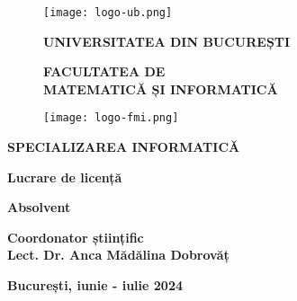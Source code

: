 \begin{titlepage}


\begin{figure}[!htb]
    \centering
    \begin{minipage}{0.2\textwidth}
        \texttt{[image: logo-ub.png]}
    \end{minipage}
    \begin{minipage}{0.5\textwidth}
        \large
        \vspace{0.2cm}
        \begin{center}
            \textbf{UNIVERSITATEA DIN BUCUREȘTI}
        \end{center}
        \vspace{0.3cm}
        \begin{center}
            \textbf{
                FACULTATEA DE \\
                MATEMATICĂ ȘI INFORMATICĂ
            }
        \end{center}
    \end{minipage}
    \begin{minipage}{0.2\textwidth}
        \texttt{[image: logo-fmi.png]}
    \end{minipage}
\end{figure}

\begin{center}
\textbf{SPECIALIZAREA INFORMATICĂ}
\end{center}

\vspace{1cm}

\begin{center}
\Large \textbf{Lucrare de licență}
\end{center}

\begin{center}
\huge \textbf{\MakeUppercase{\@title}}
\end{center}

\vspace{3cm}

\begin{center}
\large \textbf{Absolvent \\ \@author}
\end{center}

\vspace{0.25cm}

\begin{center}
\large \textbf{Coordonator științific \\ Lect. Dr. Anca Mădălina Dobrovăț}
\end{center}

\vspace{2cm}

\begin{center}
\Large \textbf{București, iunie - iulie 2024}
\end{center}
\end{titlepage}